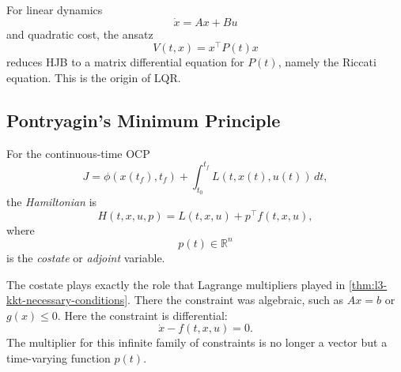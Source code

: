 \begin{remark}
	For linear dynamics
	\[
		\dot x=Ax+Bu
	\]
	and quadratic cost, the ansatz
	\[
		V(t,x)=x^\top P(t)x
	\]
	reduces HJB to a matrix differential equation for $P(t)$, namely the Riccati equation. This is the origin of LQR.
\end{remark}

\subsection{Pontryagin's Minimum Principle}
\label{sec:l4-pontryagin-s-minimum-principle}

\begin{definition}[Hamiltonian]\label{def:l4-hamiltonian}
	For the continuous-time OCP
	\[
		J=\phi(x(t_f),t_f)+\int_{t_0}^{t_f}L(t,x(t),u(t))\,dt,
	\]
	the \emph{Hamiltonian} is
	\[
		H(t,x,u,p)=L(t,x,u)+p^\top f(t,x,u),
	\]
	where
	\[
		p(t)\in \mathbb{R}^n
	\]
	is the \emph{costate} or \emph{adjoint} variable.
\end{definition}

\begin{intuition}
	The costate plays exactly the role that Lagrange multipliers played in \autoref{thm:l3-kkt-necessary-conditions}. There the constraint was algebraic, such as $Ax=b$ or $g(x)\le 0$. Here the constraint is differential:
	\[
		\dot x-f(t,x,u)=0.
	\]
	The multiplier for this infinite family of constraints is no longer a vector but a time-varying function $p(t)$.
\end{intuition}

